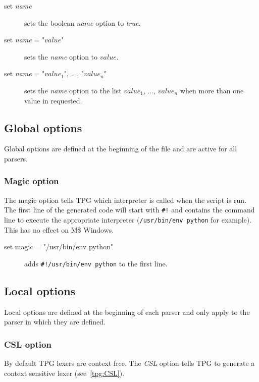 \begin{description}
	\item [set \emph{name}] sets the boolean \emph{name} option to \emph{true}.
	\item [set \emph{name} = "\emph{$value$}"] sets the \emph{name} option to \emph{$value$}.
	\item [set \emph{name} = "\emph{$value_1$}", ..., "\emph{$value_n$}"] sets the \emph{name} option to the list \emph{$value_1$}, ..., \emph{$value_n$} when more than one value in requested.
\end{description}

\subsection{Global options}

Global options are defined at the beginning of the file and are active for all parsers.

\subsubsection{Magic option}

The magic option tells TPG which interpreter is called when the script is run.
The first line of the generated code will start with \verb$#!$ and contains the command line to execute the appropriate interpreter (\verb$/usr/bin/env python$ for example).
This has no effect on M\$ Windows.

\begin{description}
	\item [set magic = "/usr/bin/env python"] adds \verb$#!/usr/bin/env python$ to the first line.
\end{description}

\subsection{Local options}

Local options are defined at the beginning of each parser and only apply to the parser in which they are defined.

\subsubsection{CSL option}									\label{grammar:CSL}

By default TPG lexers are context free.
The \emph{CSL} option tells TPG to generate a context sensitive lexer (see~\ref{tpg:CSL}).

